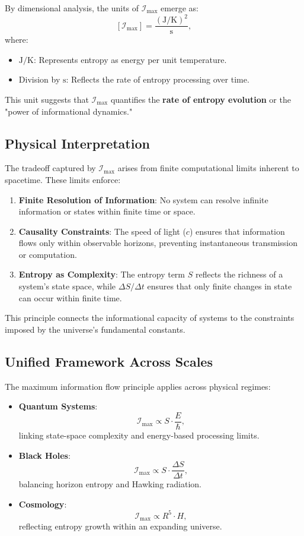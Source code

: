 \documentclass[12pt]{article}
\begin{document}
By dimensional analysis, the units of \( \mathcal{I}_{\text{max}} \) emerge as:
\[
\left[\mathcal{I}_{\text{max}}\right] = \frac{(\text{J}/\text{K})^2}{\text{s}},
\]
where:
\begin{itemize}
    \item \( \text{J}/\text{K} \): Represents entropy as energy per unit temperature.
    \item Division by \( \text{s} \): Reflects the rate of entropy processing over time.
\end{itemize}

This unit suggests that \( \mathcal{I}_{\text{max}} \) quantifies the \textbf{rate of entropy evolution} or the "power of informational dynamics."

\subsection{Physical Interpretation}
The tradeoff captured by \( \mathcal{I}_{\text{max}} \) arises from finite computational limits inherent to spacetime. These limits enforce:
\begin{enumerate}
    \item \textbf{Finite Resolution of Information}: No system can resolve infinite information or states within finite time or space.
    \item \textbf{Causality Constraints}: The speed of light (\( c \)) ensures that information flows only within observable horizons, preventing instantaneous transmission or computation.
    \item \textbf{Entropy as Complexity}: The entropy term \( S \) reflects the richness of a system’s state space, while \( \Delta S / \Delta t \) ensures that only finite changes in state can occur within finite time.
\end{enumerate}

This principle connects the informational capacity of systems to the constraints imposed by the universe’s fundamental constants.

\subsection{Unified Framework Across Scales}
The maximum information flow principle applies across physical regimes:
\begin{itemize}
    \item \textbf{Quantum Systems}:
    \[
    \mathcal{I}_{\text{max}} \propto S \cdot \frac{E}{\hbar},
    \]
    linking state-space complexity and energy-based processing limits.
    \item \textbf{Black Holes}:
    \[
    \mathcal{I}_{\text{max}} \propto S \cdot \frac{\Delta S}{\Delta t},
    \]
    balancing horizon entropy and Hawking radiation.
    \item \textbf{Cosmology}:
    \[
    \mathcal{I}_{\text{max}} \propto R^5 \cdot H,
    \]
    reflecting entropy growth within an expanding universe.
\end{itemize}
\end{document}
